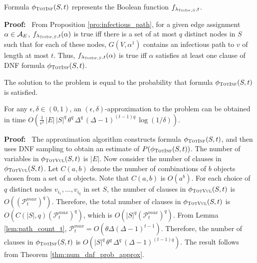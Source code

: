  \begin{proposition}\label{pro:formula_TotInf_correct}
 Formula $\phi_{\textsc{TotInf}}(S,t)$ represents the Boolean function 
 $f_{\lambda_{\textsc{TotInf},S},t}$.
 \end{proposition}
 \textbf{Proof:}~
From Proposition \ref{pro:infectious_path},
for a given edge assignment $\alpha \in {\cal A}_E$, 
$f_{\lambda_{\textsc{TotInf},S},t}(\alpha)$ is true iff 
there is a set of at most $q$ distinct nodes in $S$ such that for each of these nodes,
$G(V, \alpha^1)$ contains an infectious path to $v$ of length at most $t$.
Thus, $f_{\lambda_{\textsc{TotInf},S},t}(\alpha)$ is true iff 
$\alpha$ satisfies at least one clause of DNF formula
$\phi_{\textsc{TotInf}}(S,t)$. 
\QED

\begin{corollary}\label{cor:formula_satprob_TotInf}
 The solution to the \tTotInfs{} problem is equal to
 the probability that formula $\phi_{\textsc{TotInf}}(S,t)$ is satisfied.
\end{corollary}
 
 
\iffalse
\begin{theorem}
\label{thm:totvul_approx}
For any $\epsilon, \delta\in(0,1)$, 
an $(\epsilon, \delta)$-approximation to the \tTotVuls{} problem
can be obtained in time 
$O(\frac{1}{\epsilon^2}\,|E|\,\theta^q \,\Delta^q \,(\Delta-1)^{(t-1)q} \, \log{(1/\delta)})$. 
\end{theorem}
\fi
 
 
\begin{theorem}
\label{thm:totinf_approx}
For any $\epsilon, \delta \in (0,1)$, 
an $(\epsilon, \delta)$-approximation to the \tTotInfs{} problem
can be obtained in time 
$O(\frac{1}{\epsilon^2}\,|E|\, |S|^q \, \theta^q \,\Delta^q \,(\Delta-1)^{(t-1)q} \, \log{(1/\delta)})$. 
\end{theorem}
\noindent
\textbf{Proof:}~
The approximation algorithm constructs formula $\phi_{\textsc{TotInf}}(S,t)$,
and then uses DNF sampling to obtain an estimate of $P(\phi_{\textsc{TotInf}}(S,t))$.
The number of variables in $\phi_{\textsc{TotVul}}(S,t)$ is $|E|$.
Now consider the number of clauses in $\phi_{\textsc{TotVul}}(S,t)$.
Let $C(a,b)$ denote the number of combinations of $b$ objects chosen from a set of $a$ objects.
Note that $C(a,b)$ is $O(a^b)$.
For each choice of $q$ distinct nodes $v_{i_1},  \ldots, v_{i_q}$ in set $S$, 
the number of clauses in $\phi_{\textsc{TotVul}}(S,t)$ 
is  $O( ( \mathcal{P}_t^{max} )^q )$.
Therefore, the total number of clauses in $\phi_{\textsc{TotVul}}(S,t)$ 
is  $O( C(|S|,q) ( \mathcal{P}_t^{max} )^q )$,
which is $O(  |S|^q ( \mathcal{P}_t^{max} )^q )$.
From Lemma \ref{lem:path_count_t}, 
$\mathcal{P}_t^{max} = O(\theta \Delta (\Delta-1)^{t-1})$.
Therefore, the number of clauses in $\phi_{\textsc{TotInf}}(S,t)$
is  $O(  |S|^q \, \theta^q \,\Delta^q \,(\Delta-1)^{(t-1)q} )$.
The result follows from Theorem \ref{thm:num_dnf_prob_approx}. 
 \QED

